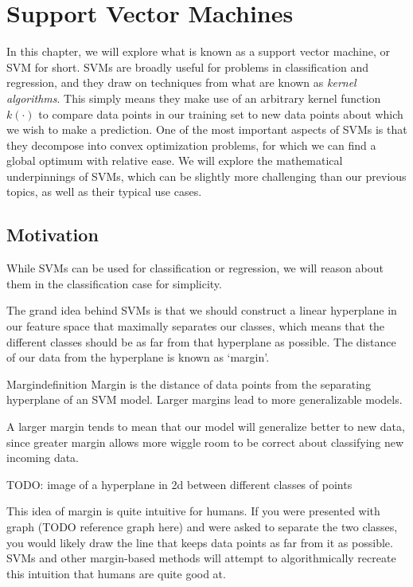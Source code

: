 \chapter{Support Vector Machines}
In this chapter, we will explore what is known as a support vector machine, or SVM for short. SVMs are broadly useful for problems in classification and regression, and they draw on techniques from what are known as \textit{kernel algorithms}. This simply means they make use of an arbitrary kernel function $k(\cdot)$ to compare data points in our training set to new data points about which we wish to make a prediction. One of the most important aspects of SVMs is that they decompose into convex optimization problems, for which we can find a global optimum with relative ease. We will explore the mathematical underpinnings of SVMs, which can be slightly more challenging than our previous topics, as well as their typical use cases.

\section{Motivation}
While SVMs can be used for classification or regression, we will reason about them in the classification case for simplicity. 

The grand idea behind SVMs is that we should construct a linear hyperplane in our feature space that maximally separates our classes, which means that the different classes should be as far from that hyperplane as possible. The distance of our data from the hyperplane is known as `margin'.

\begin{definition}{Margin}{definition}
Margin is the distance of data points from the separating hyperplane of an SVM model. Larger margins lead to more generalizable models.
\end{definition}

A larger margin tends to mean that our model will generalize better to new data, since greater margin allows more wiggle room to be correct about classifying new incoming data.

TODO: image of a hyperplane in 2d between different classes of points

This idea of margin is quite intuitive for humans. If you were presented with graph (TODO reference graph here) and were asked to separate the two classes, you would likely draw the line that keeps data points as far from it as possible. SVMs and other margin-based methods will attempt to algorithmically recreate this intuition that humans are quite good at.

